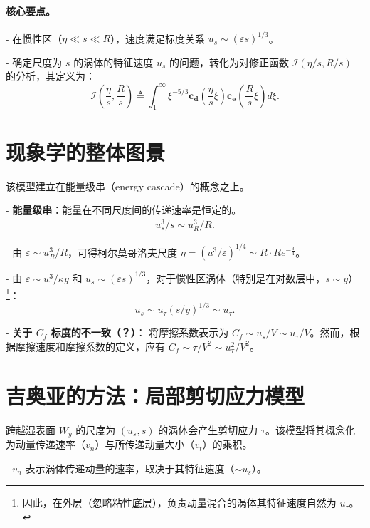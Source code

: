 \documentclass[10pt]{article}
\begin{document}
\paragraph{核心要点。}

    
- 在惯性区（$\eta \ll s \ll R$），速度满足标度关系 $u_s \sim \left( \varepsilon s \right) ^{1 / 3} $。
    
- 确定尺度为 $s$ 的涡体的特征速度 $u_s$ 的问题，转化为对修正函数 $\mathcal{I}\left( \eta / s, R / s \right)$ 的分析，其定义为：
    \[
        \mathcal{I}\left( \frac{\eta}{s}, \frac{R}{s} \right)  \triangleq \int_1^{\infty} \xi^{-5 / 3} \mathbf{c_d}\left( \frac{\eta}{s} \xi \right) \mathbf{c_e} \left( \frac{R}{s} \xi \right) d\xi.
    \]


\section{现象学的整体图景}
该模型建立在能量级串（energy cascade）的概念之上。

    
- \textbf{能量级串}：能量在不同尺度间的传递速率是恒定的。
        \begin{align*}
            u_s^3 / s \sim u_R^3 / R
        .\end{align*}
        
            
- 由 $\varepsilon \sim u_R^3 / R$，可得柯尔莫哥洛夫尺度 $\eta = \left( 
u^3 / \varepsilon \right)^{1 / 4}\sim R\cdot Re^{-\frac{3}{4}} $。
            
- 由 $\varepsilon  \sim {u_{\tau }^3}/{\kappa y}$ 和 $u_s\sim \left( \varepsilon s \right) ^{1 / 3} $，对于惯性区涡体（特别是在对数层中，$s \sim y$）\footnote{因此，在外层（忽略粘性底层），负责动量混合的涡体其特征速度自然为 $u_{\tau }$。}：
                $$u_s \sim u_{\tau } \left( s / y \right) ^{1 / 3} \sim u_{\tau}.$$ 
            
- \textbf{关于 $C_f$ 标度的不一致（？）}：\citet{gioiaFriction2006} 将摩擦系数表示为 $C_f \sim u_s / V \sim u_{\tau } / V$。然而，根据摩擦速度和摩擦系数的定义，应有 $C_f \sim \tau / V^2 \sim u_{\tau }^2 / V^2$。
        


\section{吉奥亚的方法：局部剪切应力模型}
跨越湿表面 $W_y$ 的尺度为 $(u_s, s)$ 的涡体会产生剪切应力 $\tau$。该模型将其概念化为动量传递速率（$v_n$）与所传递动量大小（$v_t$）的乘积。

    
- $v_n$ 表示涡体传递动量的速率，取决于其特征速度（$\sim u_s$）。
    
\end{document}
